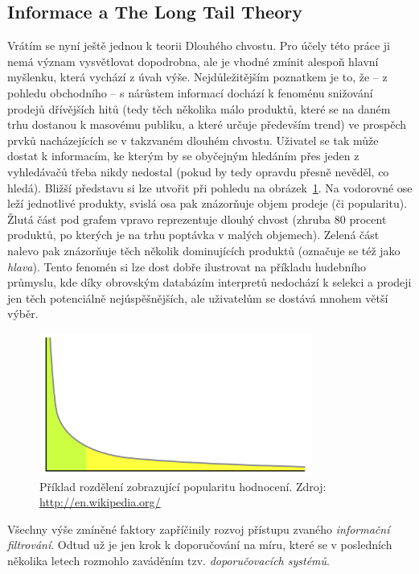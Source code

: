 \documentclass[thesis=M,czech]{FITthesis}[2014/05/07]
\begin{document}
\begin{introduction}
	\subsection{Informace a The Long Tail Theory}	
	Vrátím se nyní ještě jednou k teorii Dlouhého chvostu. Pro účely této práce ji nemá význam vysvětlovat dopodrobna, ale je vhodné zmínit alespoň hlavní myšlenku, která vychází z úvah výše. Nejdůležitějším poznatkem je to, že – z pohledu obchodního – s nárůstem informací dochází k fenoménu snižování prodejů dřívějších hitů (tedy těch několika málo produktů, které se na daném trhu dostanou k masovému publiku, a které určuje především trend) ve prospěch prvků nacházejících se v takzvaném dlouhém chvostu. Uživatel se tak může dostat k informacím, ke kterým by se obyčejným hledáním přes jeden z vyhledávačů třeba nikdy nedostal (pokud by tedy opravdu přesně nevěděl, co hledá). Bližší představu si lze utvořit při pohledu na obrázek~\ref{fig:longtail}. Na vodorovné ose leží jednotlivé produkty, svislá osa pak znázorňuje objem prodeje (či popularitu). Žlutá část pod grafem vpravo reprezentuje dlouhý chvost (zhruba 80 procent produktů, po kterých je na trhu poptávka v malých objemech). Zelená část nalevo pak znázorňuje těch několik dominujících produktů (označuje se též jako \emph{hlava}). Tento fenomén si lze dost dobře ilustrovat na příkladu hudebního průmyslu, kde díky obrovským databázím interpretů nedochází k selekci a prodeji jen těch potenciálně nejúspěšnějších, ale uživatelům se dostává mnohem větší výběr.
	
\begin{figure}\centering
	\includegraphics[width=0.8\textwidth]{obr/longtail.png}
 	\caption{Příklad rozdělení zobrazující popularitu hodnocení. Zdroj: \url{http://en.wikipedia.org/} \cite{wiki:longtail}}\label{fig:longtail}
\end{figure}	

	Všechny výše zmíněné faktory zapříčinily rozvoj přístupu zvaného \emph{informační filtrování}. Odtud už je jen krok k doporučování na míru, které se v posledních několika letech rozmohlo zaváděním tzv. \emph{doporučovacích systémů}.


\end{introduction}
\end{document}
